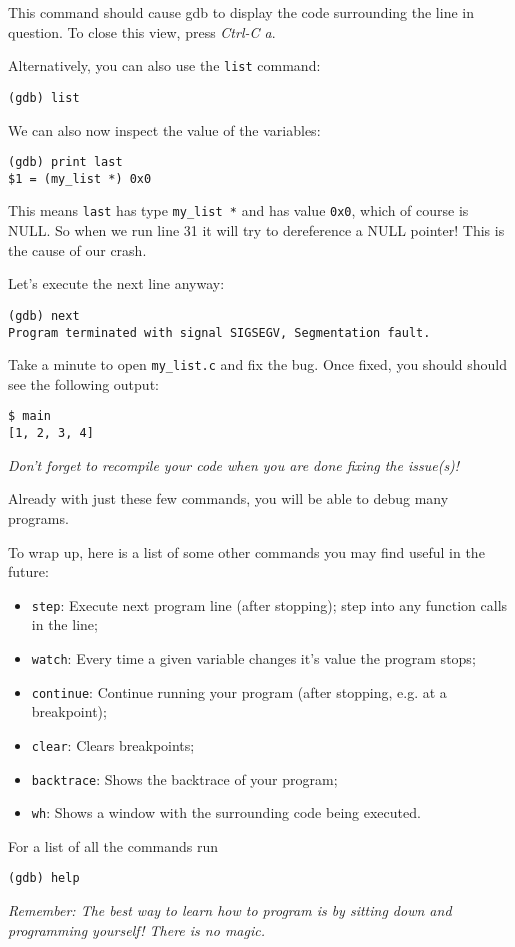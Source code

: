 \documentclass[11pt]{article}
\begin{document}
This command should cause gdb to display the code surrounding the line
in question. To close this view, press \textit{Ctrl-C a}.

\clearpage

Alternatively, you can also use the {\tt list} command:
\begin{verbatim}
(gdb) list
\end{verbatim}

We can also now inspect the value of the variables:

\begin{verbatim}
(gdb) print last
$1 = (my_list *) 0x0
\end{verbatim}

This means {\tt last} has type {\tt my\_list *} and has value {\tt 0x0},
which of course is NULL. So when we run line 31 it will try to dereference
a NULL pointer! This is the cause of our crash.

Let's execute the next line anyway:

\begin{verbatim}
(gdb) next
Program terminated with signal SIGSEGV, Segmentation fault.
\end{verbatim}

Take a minute to open {\tt my\_list.c} and fix the bug.  Once fixed,
you should should see the following output:

\begin{verbatim}
$ main
[1, 2, 3, 4]
\end{verbatim}

\textit{Don't forget to recompile your code when you are done fixing
the issue(s)!}

Already with just these few commands, you will be able to debug many
programs.

To wrap up, here is a list of some other commands you may find useful
in the future:

\begin{itemize}[noitemsep]
  \item {\tt step}: Execute next program line (after stopping); step into any
function calls in the line;
  \item {\tt watch}: Every time a given variable changes it's value the program stops;
  \item {\tt continue}: Continue running your program (after stopping, e.g. at a breakpoint);
  \item {\tt clear}: Clears breakpoints;
  \item {\tt backtrace}:  Shows the backtrace of your program;
  \item {\tt wh}:  Shows a window with the surrounding code being executed.
\end{itemize}

For a list of all the commands run
\begin{verbatim}
(gdb) help
\end{verbatim}

\textit{Remember: The best way to learn how to program is by sitting down and
programming yourself! There is no magic.}
\end{document}
